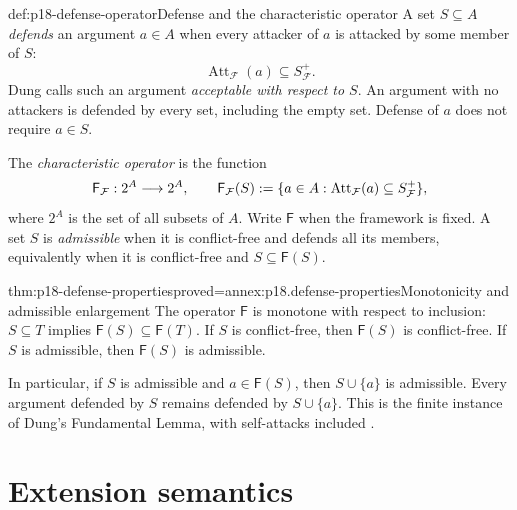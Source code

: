 \begin{hbdefinition}{def:p18-defense-operator}{Defense and the characteristic operator}
A set \(S\subseteq A\) \emph{defends} an argument \(a\in A\)
when every attacker of \(a\) is attacked by some member of \(S\):
\[
 \operatorname{Att}_{\mathcal F}(a)\subseteq S^+_{\mathcal F}.
\]
Dung calls such an argument \emph{acceptable with respect to \(S\)}.
An argument with no attackers is defended by every set, including the empty
set. Defense of \(a\) does not require \(a\in S\).

The \emph{characteristic operator} is the function
\[
 \mathsf F_{\mathcal F}:2^A\longrightarrow2^A,\qquad
 \mathsf F_{\mathcal F}(S)
 \mathrel{:=}\{a\in A:\operatorname{Att}_{\mathcal F}(a)\subseteq S^+_{\mathcal F}\},
\]
where \(2^A\) is the set of all subsets of \(A\). Write \(\mathsf F\)
when the framework is fixed. A set \(S\) is \emph{admissible} when it
is conflict-free and defends all its members, equivalently when it is
conflict-free and \(S\subseteq\mathsf F(S)\).
\end{hbdefinition}

\begin{hbtheorem}{thm:p18-defense-properties}{proved=annex:p18.defense-properties}{Monotonicity and admissible enlargement}
The operator \(\mathsf F\) is monotone with respect to inclusion:
\(S\subseteq T\) implies \(\mathsf F(S)\subseteq\mathsf F(T)\).
If \(S\) is conflict-free, then \(\mathsf F(S)\) is conflict-free.
If \(S\) is admissible, then \(\mathsf F(S)\) is admissible.

In particular, if \(S\) is admissible and \(a\in\mathsf F(S)\),
then \(S\cup\{a\}\) is admissible. Every argument defended by \(S\)
remains defended by \(S\cup\{a\}\). This is the finite instance of
Dung's Fundamental Lemma, with self-attacks included
\cite[lemma~10 and lemmas~18--19, pp.~327--329]{Dung1995}.
\end{hbtheorem}

\section{Extension semantics}
\label{sec:p18-extension-semantics}


